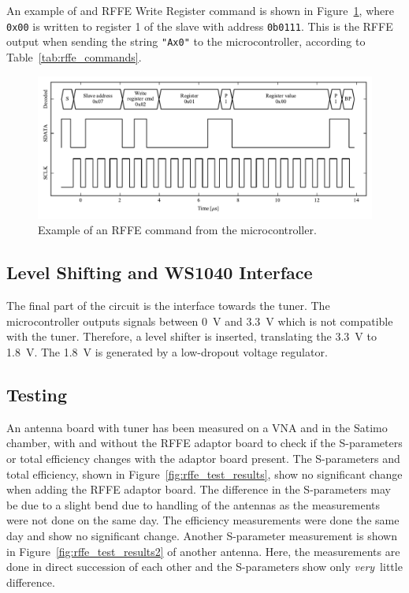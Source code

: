 An example of and RFFE Write Register command is shown in Figure~\ref{fig:rffe_example}, where \texttt{0x00} is written to register 1 of the slave with address \texttt{0b0111}. This is the RFFE output when sending the string \texttt{"Ax0"} to the microcontroller, according to Table~\ref{tab:rffe_commands}.

\begin{figure}[htbp]
    \centering
    \includegraphics{img/optical_rffe/avr_rffe_reg1_0x00}
    \caption{Example of an RFFE command from the microcontroller.}
    \label{fig:rffe_example}
\end{figure}

\subsection{Level Shifting and WS1040 Interface}
The final part of the circuit is the interface towards the tuner. The microcontroller outputs signals between \SI{0}{V} and \SI{3.3}{V} which is not compatible with the tuner. Therefore, a level shifter is inserted, translating the \SI{3.3}{V} to \SI{1.8}{V}. The \SI{1.8}{V} is generated by a low-dropout voltage regulator.

\subsection{Testing}
An antenna board with tuner has been measured on a VNA and in the Satimo chamber, with and without the RFFE adaptor board to check if the S-parameters or total efficiency changes with the adaptor board present. The S-parameters and total efficiency, shown in Figure~\ref{fig:rffe_test_results}, show no significant change when adding the RFFE adaptor board. The difference in the S-parameters may be due to a slight bend due to handling of the antennas as the measurements were not done on the same day. The efficiency measurements were done the same day and show no significant change. Another S-parameter measurement is shown in Figure~\ref{fig:rffe_test_results2} of another antenna. Here, the measurements are done in direct succession of each other and the S-parameters show only \emph{very} little difference.

